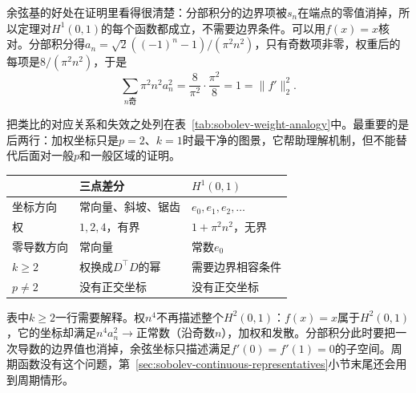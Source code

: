 余弦基的好处在证明里看得很清楚：分部积分的边界项被$s_n$在端点的零值消掉，所以定理对$H^1(0,1)$的每个函数都成立，不需要边界条件。可以用$f(x)=x$核对。分部积分得$a_n=\sqrt2((-1)^n-1)/(\pi^2n^2)$，只有奇数项非零，权重后的每项是$8/(\pi^2n^2)$，于是
\[
\sum_{n\text{奇}}\pi^2n^2a_n^2=\frac8{\pi^2}\cdot\frac{\pi^2}8=1=\lVert f'\rVert_2^2.
\]

把类比的对应关系和失效之处列在表~\ref{tab:sobolev-weight-analogy}中。最重要的是后两行：加权坐标只是$p=2$、$k=1$时最干净的图景，它帮助理解机制，但不能替代后面对一般$p$和一般区域的证明。

\begin{BookInlineTable}
  \centering
  \caption{有限维二次型与$H^1(0,1)$的对应。}
  \label{tab:sobolev-weight-analogy}
  \begin{tabular}{lll}
    \toprule
    & 三点差分 & $H^1(0,1)$\\
    \midrule
    坐标方向 & 常向量、斜坡、锯齿 & $e_0,e_1,e_2,\ldots$\\
    权 & $1,2,4$，有界 & $1+\pi^2n^2$，无界\\
    零导数方向 & 常向量 & 常数$e_0$\\
    $k\geq2$ & 权换成$D^\top D$的幂 & 需要边界相容条件\\
    $p\neq2$ & 没有正交坐标 & 没有正交坐标\\
    \bottomrule
  \end{tabular}
\end{BookInlineTable}

表中$k\geq2$一行需要解释。权$n^4$不再描述整个$H^2(0,1)$：$f(x)=x$属于$H^2(0,1)$，它的坐标却满足$n^4a_n^2\to$正常数（沿奇数$n$），加权和发散。分部积分此时要把一次导数的边界值也消掉，余弦坐标只描述满足$f'(0)=f'(1)=0$的子空间。周期函数没有这个问题，第~\ref{sec:sobolev-continuous-representatives}小节末尾还会用到周期情形。
